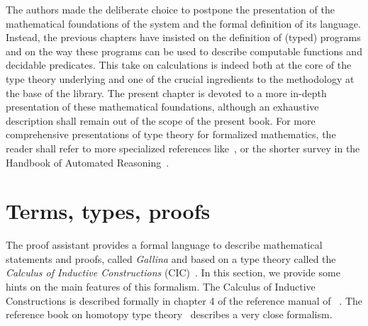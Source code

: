\label{ch:ttch}

The authors made the deliberate choice to postpone the presentation of
the mathematical foundations of the \Coq{} system and the formal
definition of its language. Instead, the previous chapters have
insisted on the definition of (typed) programs and on the way these
programs can be used to describe computable functions and decidable
predicates. This take on calculations is indeed both at the core of
the type theory underlying \Coq{} and one of the crucial ingredients
to the methodology at the base of the \mcbMC{} library. The present chapter is
devoted to a more in-depth presentation of these mathematical
foundations, although an exhaustive description shall remain out of
the scope of the present book. For more comprehensive presentations of
type theory for formalized mathematics, the reader shall refer to more
specialized references like~\cite{ttfp}, or the
shorter survey in the Handbook of Automated
Reasoning~\cite[Volume 2, chapter 18]{handbook-ar}.

\section{Terms, types, proofs}\label{sec:chi}

The \Coq{} proof assistant provides a formal language to describe
mathematical statements and proofs, called
\emph{Gallina} and based on a type theory called the
\emph{Calculus of Inductive
  Constructions} (CIC)~\cite{coquand:huet:88,CoPa89}. In this section, we
provide some hints on the main features of this formalism. The
Calculus of Inductive Constructions is described formally in chapter 4
of the reference manual of \Coq{}~\cite{Coq:manual}. The reference book on
homotopy type theory~\cite{hottbook} describes a very close formalism.



